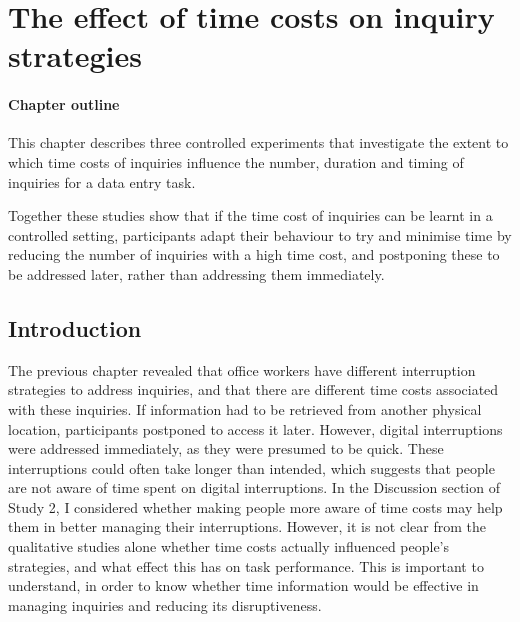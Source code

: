 \chapter{The effect of time costs on inquiry strategies}\label{ch:34}

\begin{mynote}
\subsubsection{Chapter outline}
This chapter describes three controlled experiments that investigate the extent to which time costs of inquiries influence the number, duration and timing of inquiries for a data entry task. 


Together these studies show that if the time cost of inquiries can be learnt in a controlled setting, participants adapt their behaviour to try and minimise time by reducing the number of inquiries with a high time cost, and postponing these to be addressed later, rather than addressing them immediately. 

\end{mynote}
 
 \section{Introduction}
The previous chapter revealed that office workers have different interruption strategies to address inquiries, and that there are different time costs associated with these inquiries. If information had to be retrieved from another physical location, participants postponed to access it later. However, digital interruptions were addressed immediately, as they were presumed to be quick. These interruptions could often take longer than intended, which suggests that people are not aware of time spent on digital interruptions. In the Discussion section of Study 2, I considered whether making people more aware of time costs may help them in better managing their interruptions. However, it is not clear from the qualitative studies alone whether time costs actually influenced people's strategies, and what effect this has on task performance. This is important to understand, in order to know whether time information would be effective in managing inquiries and reducing its disruptiveness.

